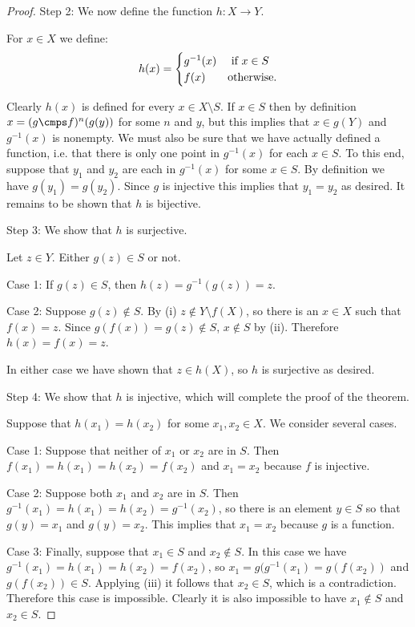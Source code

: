 \begin{proof}
\smallbreak\noindent
{\cscp Step 2:} We now define the function $h:X\to Y$.

For $x\in X$ we define: \[ h(x)=
\begin{cases}
g^{-1}(x) & \mbox{ if } x\in S\cr
f(x) & \mbox{otherwise.}\cr
\end{cases}\]

Clearly $h(x)$ is defined for every $x\in X\setminus S$.  If $x\in S$
then by definition $x=(g\cmps f)^n(g(y))$ for some $n$ and $y$, but this
implies that $x\in g(Y)$ and $g^{-1}(x)$ is nonempty.  We must also be
sure that we have actually defined a function, i.e. that there is only
one point in $g^{-1}(x)$ for each $x\in S$.  To this end, suppose
that $y_1$ and $y_2$ are each in $g^{-1}(x)$ for some $x\in S$.  By
definition we have $g(y_1)=g(y_2)$.  Since $g$ is injective this implies
that $y_1=y_2$ as desired.  It remains to be shown that $h$ is
bijective.

\smallbreak\noindent
{\cscp Step 3:} We show that $h$ is surjective.

Let $z\in Y$.  Either $g(z)\in S$ or not.

\noindent
{\cscp Case 1:} If $g(z)\in S$, then $h(z)=g^{-1}(g(z))=z$.

\noindent
{\cscp Case 2:} Suppose $g(z)\notin S$.  By (i) $z\notin Y\setminus
f(X)$, so there is an $x\in X$ such that $f(x)=z$.  Since
$g(f(x))=g(z)\notin S$, $x\notin S$ by (ii).  Therefore $h(x)=f(x)=z$.

In either case we have shown that $z\in h(X)$, so $h$ is surjective as
desired.

\smallbreak\noindent
{\cscp Step 4:} We show that $h$ is injective, which will complete the
proof of the theorem.

Suppose that $h(x_1)=h(x_2)$ for some $x_1,x_2\in X$.  We consider
several cases.

\noindent
{\cscp Case 1:} Suppose that neither of $x_1$ or $x_2$ are in $S$.  Then
$f(x_1)=h(x_1)=h(x_2)=f(x_2)$ and $x_1=x_2$ because $f$ is injective.

\noindent
{\cscp Case 2:} Suppose both $x_1$ and $x_2$ are in $S$.  Then
$g^{-1}(x_1)= h(x_1)= h(x_2)= g^{-1} (x_2)$, so there is an element
$y\in S$ so that $g(y)=x_1$ and $g(y)=x_2$.  This implies that $x_1=x_2$
because $g$ is a function.

\noindent
{\cscp Case 3:} Finally, suppose that $x_1\in S$ and $x_2\notin S$.  In
this case we have $g^{-1}(x_1)=h(x_1)=h(x_2)=f(x_2)$, so $x_1=
g(g^{-1}(x_1)= g(f(x_2))$ and $g(f(x_2))\in S$.  Applying (iii) it
follows that $x_2\in S$, which is a contradiction.  Therefore this case
is impossible.  Clearly it is also impossible to have $x_1\notin S$ and
$x_2\in S$.
\end{proof}



\clearpage
